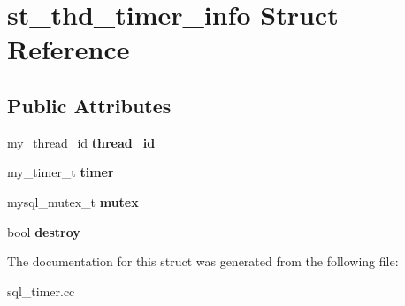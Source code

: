 \hypertarget{structst__thd__timer__info}{}\section{st\+\_\+thd\+\_\+timer\+\_\+info Struct Reference}
\label{structst__thd__timer__info}
\subsection*{Public Attributes}
\begin{DoxyCompactItemize}
\item 
\mbox{\label{structst__thd__timer__info_a5637f69b256fc7e4af9d259d7ea80f11}} 
my\+\_\+thread\+\_\+id {\bfseries thread\+\_\+id}
\item 
\mbox{\label{structst__thd__timer__info_a0175c1fc693f8e177879545e788edfca}} 
my\+\_\+timer\+\_\+t {\bfseries timer}
\item 
\mbox{\label{structst__thd__timer__info_aa34dcc01c05da91d0648ddd2b1f78bb9}} 
mysql\+\_\+mutex\+\_\+t {\bfseries mutex}
\item 
\mbox{\label{structst__thd__timer__info_a5e2780374622c23a90ff573acb488c0e}} 
bool {\bfseries destroy}
\end{DoxyCompactItemize}


The documentation for this struct was generated from the following file\+:\begin{DoxyCompactItemize}
\item 
sql\+\_\+timer.\+cc\end{DoxyCompactItemize}
